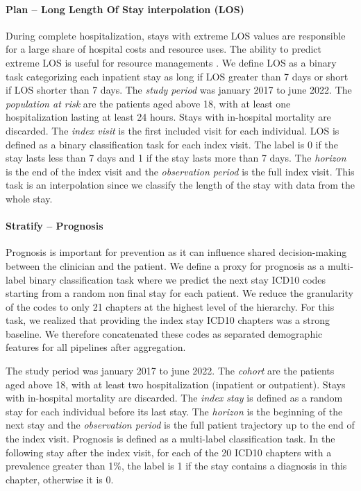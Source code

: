 \documentclass[french,12pt,twoside,a4paper]{book}
\begin{document}
\begin{appendices}
  \paragraph{Plan -- Long Length Of Stay interpolation (LOS)}%
  \label{apd:task_definitions:los}%
  During complete hospitalization, stays with extreme LOS values are responsible
  for a large share of hospital costs and resource uses. The ability to predict
  extreme LOS is useful for resource managements
  \citep{omachonu2004predicting,caetano2014data,jiang2023health}. We define LOS as
  a binary task categorizing each inpatient stay as long if LOS greater than 7
  days or short if LOS shorter than 7 days.
  The \emph{study period} was january 2017 to june 2022. The \emph{population at
    risk} are the patients aged above 18, with at least one hospitalization lasting
  at least 24 hours. Stays with in-hospital mortality are discarded. The
  \emph{index visit} is the first included visit for each individual. LOS is
  defined as a binary classification task for each index visit. The label is 0 if
  the stay lasts less than 7 days and 1 if the stay lasts more than 7 days. The
  \emph{horizon} is the end of the index visit and the \emph{observation period}
  is the full index visit. This task is an interpolation since we classify the
  length of the stay with data from the whole stay.


  \paragraph{Stratify -- Prognosis}\label{apd:task_details:prognosis}%
  Prognosis is important for prevention as it can influence shared decision-making
  between the clinician and the patient. We define a proxy for prognosis as a
  multi-label binary classification task where we predict the next stay ICD10
  codes starting from a random non final stay for each patient. We reduce the
  granularity of the codes to only 21 chapters at the highest level of the
  hierarchy. For this task, we realized that providing the index stay ICD10
  chapters was a strong baseline. We therefore concatenated these codes as
  separated demographic features for all pipelines after aggregation.

  The study period was january 2017 to june 2022. The \emph{cohort}
  are the patients aged above 18, with at least two hospitalization (inpatient or
  outpatient). Stays with in-hospital mortality are discarded. The \emph{index
    stay} is defined as a random stay for each individual before its last stay. The
  \emph{horizon} is the beginning of the next stay and the \emph{observation
    period} is the full patient trajectory up to the end of the index visit.
  Prognosis is defined as a multi-label classification task. In the following stay
  after the index visit, for each of the 20 ICD10 chapters with a prevalence
  greater than 1\%, the label is 1 if the stay contains a diagnosis in this
  chapter, otherwise it is 0.




\end{appendices}
\end{document}
